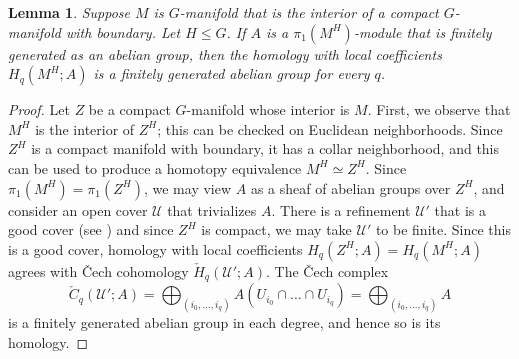 \documentclass[11pt]{amsart}
\newtheorem{lemma}[equation]{Lemma}
\theoremstyle{definition}
\numberwithin{equation}{subsection} %
\newcommand{\hteq}{\simeq}
\newcommand{\ints}{\cap}
\begin{document}
\begin{lemma}\label{lem:local-coeffs}
Suppose $M$ is $G$-manifold that is the interior of a compact $G$-manifold
with boundary. Let $H\leq G$. If $A$ is a $\pi_1(M^H)$-module that is finitely
generated as an abelian group, then the homology with local coefficients
$H_q(M^H;A)$ is a finitely generated abelian group for every $q$.
\end{lemma}
\begin{proof}
Let $Z$ be a compact $G$-manifold whose interior is $M$.
First, we observe that $M^H$ is the interior of $Z^H$;
this can be checked on Euclidean neighborhoods. Since $Z^H$ is a compact
manifold with boundary, it has a collar neighborhood, and this can be used to
produce a homotopy equivalence $M^H \hteq Z^H$. Since $\pi_1(M^H) = \pi_1(Z^H)$,
we may view $A$ as a sheaf of abelian
groups over $Z^H$, and consider an open cover $\mathscr{U}$ that trivializes
$A$. There is a refinement $\mathscr{U}'$ that is a good cover (see
\cite[Corollary 5.2]{bott-tu}) and since $Z^H$ is compact, we may take
$\mathscr{U}'$ to be finite. Since this is a good cover, homology with local
coefficients $H_q(Z^H;A)=H_q(M^H;A)$ agrees with \v{C}ech cohomology
$\check{H}_q(\mathscr{U}';A)$. The \v{C}ech complex
$$ \check{C}_q(\mathscr{U}';A) = \bigoplus_{(i_0,\dots,i_q)} A(U_{i_0}\ints
\dots \ints U_{i_q}) = \bigoplus_{(i_0,\dots,i_q)}A $$
is a finitely generated abelian group in each degree, and hence so is its homology.
\end{proof}
\end{document}
